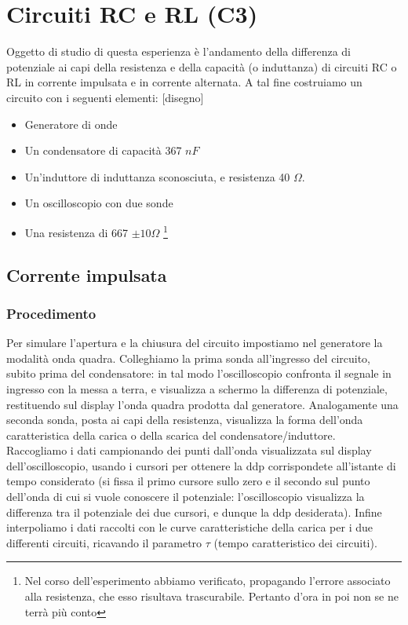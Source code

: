 \chapter{Circuiti RC e RL (C3)}

Oggetto di studio di questa esperienza è l'andamento della differenza di potenziale ai capi della resistenza e della capacità (o induttanza) di circuiti RC o RL in corrente impulsata e in corrente alternata.
A tal fine costruiamo un circuito con i seguenti elementi:
[disegno]

\begin{itemize}
  \item Generatore di onde
  \item Un condensatore di capacità 367 $nF$
  \item Un'induttore di induttanza sconosciuta, e resistenza 40 $\Omega$.
  \item Un oscilloscopio con due sonde
  \item Una resistenza di 667 $\pm 10 \Omega$  \footnote{Nel corso dell'esperimento abbiamo verificato, propagando l'errore associato alla resistenza, che esso risultava trascurabile. Pertanto d'ora in poi non se ne terrà più conto}
\end{itemize}

\section{Corrente impulsata}
\subsection{Procedimento}


Per simulare l'apertura e la chiusura del circuito impostiamo nel generatore la modalità onda quadra. Colleghiamo la prima sonda all'ingresso del circuito, subito prima del condensatore: in tal modo l'oscilloscopio confronta il segnale in ingresso con la messa a terra, e visualizza a schermo la differenza di potenziale, restituendo sul display l'onda quadra prodotta dal generatore.  
Analogamente una seconda sonda, posta ai capi della resistenza, visualizza la forma dell'onda caratteristica della carica o della scarica del condensatore/induttore. \\
Raccogliamo i dati campionando dei punti dall'onda visualizzata sul display dell'oscilloscopio, usando i cursori per ottenere la ddp corrispondete all'istante di tempo considerato (si fissa il primo cursore sullo zero e il secondo sul punto dell'onda di cui si vuole conoscere il potenziale: l'oscilloscopio visualizza la differenza tra il potenziale dei due cursori, e dunque la ddp desiderata).
Infine interpoliamo i dati raccolti con le curve caratteristiche della carica per i due differenti circuiti, ricavando il parametro $\tau$ (tempo caratteristico dei circuiti).

